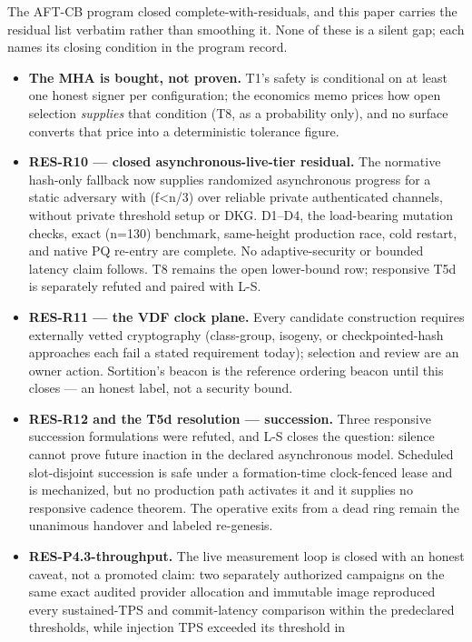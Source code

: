 \documentclass[11pt]{article}
\begin{document}
The AFT-CB program closed complete-with-residuals, and this paper carries
the residual list verbatim rather than smoothing it. None of these is a
silent gap; each names its closing condition in the program record.

\begin{itemize}[leftmargin=1.5em]
\item \textbf{The MHA is bought, not proven.} T1's safety is conditional
on at least one honest signer per configuration; the economics memo
prices how open selection \emph{supplies} that condition (T8, as a
probability only), and no surface converts that price into a
deterministic tolerance figure.
\item \textbf{RES-R10 --- closed asynchronous-live-tier residual.} The
normative hash-only fallback now supplies randomized asynchronous progress for
a static adversary with (f<n/3) over reliable private authenticated
channels, without private threshold setup or DKG. D1--D4, the load-bearing
mutation checks, exact (n=130) benchmark, same-height production race, cold
restart, and native PQ re-entry are complete. No adaptive-security or bounded
latency claim follows. T8 remains the open lower-bound row; responsive T5d is
separately refuted and paired with L-S.
\item \textbf{RES-R11 --- the VDF clock plane.} Every candidate
construction requires externally vetted cryptography (class-group,
isogeny, or checkpointed-hash approaches each fail a stated requirement
today); selection and review are an owner action. Sortition's beacon is
the reference ordering beacon until this closes --- an honest label, not
a security bound.
\item \textbf{RES-R12 and the T5d resolution --- succession.} Three
responsive succession formulations were refuted, and L-S closes the question:
silence cannot prove future inaction in the declared asynchronous model.
Scheduled slot-disjoint succession is safe under a formation-time clock-fenced
lease and is mechanized, but no production path activates it and it supplies no
responsive cadence theorem. The operative exits from a dead ring remain the
unanimous handover and labeled re-genesis.
\item \textbf{RES-P4.3-throughput.} The live measurement loop is closed
with an honest caveat, not a promoted claim: two separately authorized
campaigns on the same exact audited provider allocation and immutable
image reproduced every sustained-TPS and commit-latency comparison within
the predeclared thresholds, while injection TPS exceeded its threshold in

\end{itemize}
\end{document}
